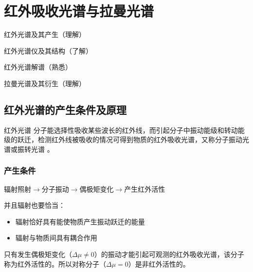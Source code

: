 \chapter{红外吸收光谱与拉曼光谱}
\begin{introduction}
	\item 红外光谱及其产生（理解）
	\item 红外光谱仪及其结构（了解）
	\item 红外光谱解谱（熟悉）
	\item 拉曼光谱及其衍生（理解）
\end{introduction}
\section{红外光谱的产生条件及原理}
\begin{definition*}{红外光谱}
	分子能选择性吸收某些波长的红外线，而引起分子中振动能级和转动能级的跃迁，检测红外线被吸收的情况可得到物质的红外吸收光谱，又称分子振动光谱或振转光谱 。
\end{definition*}
\subsection{产生条件}
辐射照射$\to$分子振动$\to$偶极矩变化$\to$产生红外活性

并且辐射也要恰当：
\begin{itemize}
	\item 辐射恰好具有能使物质产生振动跃迁的能量
	\item 辐射与物质间具有耦合作用
\end{itemize}
\begin{note}
	只有发生偶极矩变化（$\Delta \mu \neq 0$）的振动才能引起可观测的红外吸收光谱，该分子称为红外活性的。所以对称分子（$\Delta \mu=0$）是非红外活性的。
\end{note}
